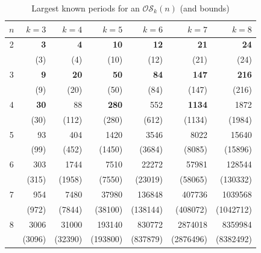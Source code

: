 \documentclass[a4paper,11pt]{article}
\theoremstyle{plain}
\theoremstyle{definition}
\theoremstyle{remark}
\begin{document}
\begin{table}[htb]
\centering \caption{Largest known periods for an $\mathcal{OS}_k(n)$ (and bounds)}
\label{table:OS_period_bounds}

\begin{tabular}{crrrrrr} \hline
$n$ & $k=3$   & $k=4$    & $k=5$    & $k=6$    & $k=7$     & $k=8$     \\ \hline
2   & {\bf 3} & {\bf 4}  & {\bf 10} & {\bf 12} & {\bf 21}  & {\bf 24}  \\
    & (3)     & (4)      & (10)     & (12)     & (21)      & (24)      \\ \hline
3   & {\bf 9} & {\bf 20} & {\bf 50} & {\bf 84} & {\bf 147} & {\bf  216}\\
    & (9)     & (20)     & (50)     & (84)     & (147)     & (216)     \\ \hline
4   & {\bf 30}& 88       & {\bf 280}& 552      & {\bf 1134}&  1872     \\
    & (30)    & (112)    & (280)    & (612)    & (1134)    & (1984)    \\ \hline
5   & 93      & 404      & 1420     & 3546     & 8022      &  15640    \\
    & (99)    & (452)    & (1450)   & (3684)   & (8085)    & (15896)   \\ \hline
6   & 303     & 1744     & 7510     & 22272    & 57981     &  128544   \\
    & (315)   & (1958)   & (7550)   & (23019)  & (58065)   & (130332)  \\ \hline
7   & 954     & 7480     & 37980    & 136848   & 407736    &  1039568  \\
    & (972)   & (7844)   & (38100)  & (138144) & (408072)  & (1042712) \\ \hline
8   & 3006    & 31000    & 193140   & 830772   & 2874018   &  8359984  \\
    & (3096)  & (32390)  & (193800) & (837879) & (2876496) & (8382492) \\ \hline
\end{tabular}
\end{table}
\end{document}

